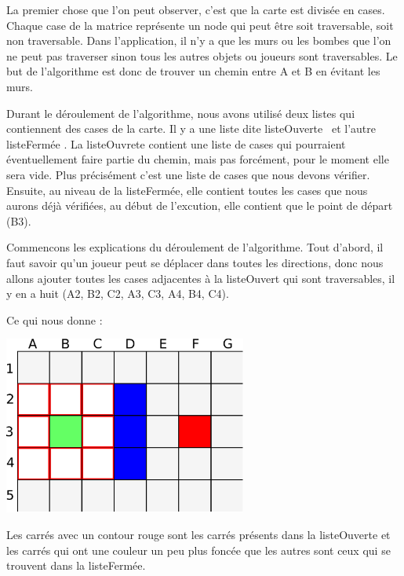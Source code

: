 			La premier chose que l'on peut observer, c'est que la carte est divisée en
			cases. Chaque case de la matrice représente un node qui peut être soit
			traversable, soit non traversable. Dans l'application, il n'y a que les murs
			ou les bombes que l'on ne peut pas traverser sinon tous les autres objets
			ou joueurs sont traversables. Le but de l'algorithme est donc de
			trouver un chemin entre A et B en évitant les murs.
			
		
			Durant le déroulement de l'algorithme, nous avons utilisé deux listes qui contiennent des cases de la carte.
			Il y a une liste dite \og listeOuverte \fg \, et l'autre \og listeFermée \fg.
			La listeOuvrete contient une liste de cases qui pourraient éventuellement faire partie du chemin, mais pas forcément, pour le moment elle sera vide.
			Plus précisément c'est une liste de cases que nous devons vérifier.
			Ensuite, au niveau de la listeFermée, elle contient toutes les cases que nous
			aurons déjà vérifiées, au début de l'excution, elle contient que le point de départ (B3).
			
		
			Commencons les explications du déroulement de l'algorithme.
			Tout d'abord, il faut savoir qu'un joueur peut se déplacer dans toutes les
			directions, donc nous allons ajouter toutes les cases adjacentes à la
			listeOuvert qui sont traversables, il y en a huit (A2, B2, C2, A3, C3, A4, B4, C4).
			
			
			Ce qui nous donne :
		
			\begin{center}
				\includegraphics[width=8cm]{./Analyse/Img/Grille2.eps}
			\end{center}
		
			Les carrés avec un contour rouge sont les carrés présents dans la
			listeOuverte et les carrés qui ont une couleur un peu plus foncée que les
			autres sont ceux qui se trouvent dans la listeFermée.
		
